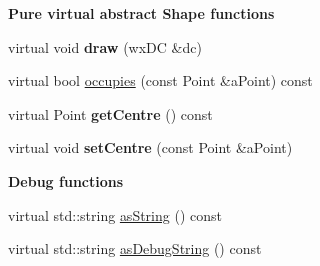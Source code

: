 \begin{Indent}{\bf Pure virtual abstract Shape functions}\par
\begin{DoxyCompactItemize}
\item 
virtual void {\bfseries draw} (wx\+DC \&dc)\hypertarget{class_view_1_1_line_shape_a84f369c61a8f0f05d84410c240390493}{}\label{class_view_1_1_line_shape_a84f369c61a8f0f05d84410c240390493}

\item 
virtual bool \hyperlink{class_view_1_1_line_shape_a746b918386d398654f3471af760878ef}{occupies} (const Point \&a\+Point) const 
\item 
virtual Point {\bfseries get\+Centre} () const \hypertarget{class_view_1_1_line_shape_a0973ec253864af16021f34633fe9fd9f}{}\label{class_view_1_1_line_shape_a0973ec253864af16021f34633fe9fd9f}

\item 
virtual void {\bfseries set\+Centre} (const Point \&a\+Point)\hypertarget{class_view_1_1_line_shape_a17d23477829fad85416320b734aa77ad}{}\label{class_view_1_1_line_shape_a17d23477829fad85416320b734aa77ad}

\end{DoxyCompactItemize}
\end{Indent}
\begin{Indent}{\bf Debug functions}\par
\begin{DoxyCompactItemize}
\item 
virtual std\+::string \hyperlink{class_view_1_1_line_shape_a814f67ef4b420635f5a71309c4d20a04}{as\+String} () const 
\item 
virtual std\+::string \hyperlink{class_view_1_1_line_shape_a625bf67fd65a8258d6186ec9e350cc45}{as\+Debug\+String} () const 
\end{DoxyCompactItemize}
\end{Indent}
